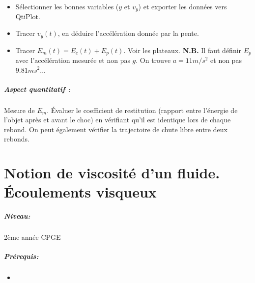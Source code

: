 \documentclass[11pt]{report}
\numberwithin{figure}{section}
\numberwithin{equation}{section}
\numberwithin{table}{section}
\newcommand{\1}{\boldsymbol{1}}
\begin{document}
\begin{tcolorbox}[breakable, enhanced, colback=red!2!white,colframe=mycolor!85!black,title=\textbf{\textbf{Expérience}}]
\begin{itemize}[label=$\triangleright$]
\begin{itemize}
	\end{itemize}
\item Sélectionner les bonnes variables ($y$ et $v_y$) et exporter les données vers QtiPlot.
\item Tracer $v_y(t)$, en déduire l'accélération donnée par la pente.
\item Tracer $E_m(t) = E_c(t) + E_p(t)$. Voir les plateaux. \textbf{N.B.} Il faut définir $E_p$ avec l'accélération mesurée et non pas $g$. On trouve $a = 11m/s^2$ et non pas $9.81ms^2$...
\end{itemize}

\paragraph*{Aspect quantitatif :} Mesure de  $E_m$. Évaluer le coefficient de restitution (rapport entre l'énergie de l'objet après et avant le choc) en vérifiant qu'il est identique lors de chaque rebond. On peut également vérifier la trajectoire de chute libre entre deux rebonds.

\end{tcolorbox}



\newpage




\chapter{Notion de viscosité d'un fluide. Écoulements visqueux}


\paragraph*{Niveau:} 2ème année CPGE
\paragraph*{Prérequis:} 
\begin{itemize}
\item 
\end{itemize}
\end{document}
